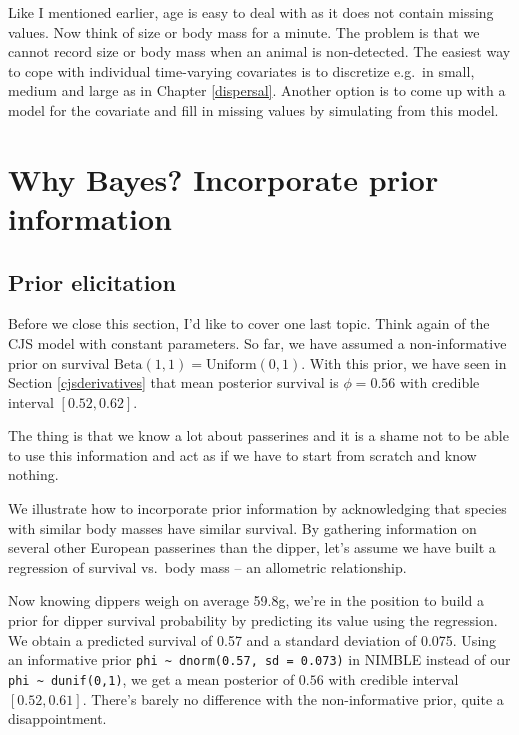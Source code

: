 \documentclass[
  12pt,
]{krantz}
\begin{document}
Like I mentioned earlier, age is easy to deal with as it does not contain missing values. Now think of size or body mass for a minute. The problem is that we cannot record size or body mass when an animal is non-detected. The easiest way to cope with individual time-varying covariates is to discretize e.g.~in small, medium and large as in Chapter \ref{dispersal}. Another option is to come up with a model for the covariate and fill in missing values by simulating from this model.

\section{Why Bayes? Incorporate prior information}\label{elicitprior}

\subsection{Prior elicitation}\label{prior-elicitation}

Before we close this section, I'd like to cover one last topic. Think again of the CJS model with constant parameters. So far, we have assumed a non-informative prior on survival \(\text{Beta}(1,1) = \text{Uniform}(0,1)\). With this prior, we have seen in Section \ref{cjsderivatives} that mean posterior survival is \(\phi = 0.56\) with credible interval \([0.52,0.62]\).

The thing is that we know a lot about passerines and it is a shame not to be able to use this information and act as if we have to start from scratch and know nothing.

We illustrate how to incorporate prior information by acknowledging that species with similar body masses have similar survival. By gathering information on several other European passerines than the dipper, let's assume we have built a regression of survival vs.~body mass -- an allometric relationship.

Now knowing dippers weigh on average 59.8g, we're in the position to build a prior for dipper survival probability by predicting its value using the regression. We obtain a predicted survival of 0.57 and a standard deviation of 0.075. Using an informative prior \texttt{phi\ \textasciitilde{}\ dnorm(0.57,\ sd\ =\ 0.073)} in NIMBLE instead of our \texttt{phi\ \textasciitilde{}\ dunif(0,1)}, we get a mean posterior of \(0.56\) with credible interval \([0.52, 0.61]\). There's barely no difference with the non-informative prior, quite a disappointment.
\end{document}
